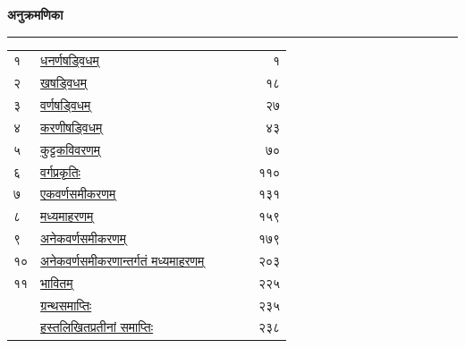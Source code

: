 \documentclass[11pt, openany]{book}
\begin{document}
\begin{center}
{\LARGE \textbf{अनुक्रमणिका}}\\
    \rule{0.2\linewidth}{0.9pt}
\end{center}

\begin{table}[h!]
    \centering
    \begin{tabular}{llr}
१ & \hyperref[ch1]{धनर्णषड्विधम्} & १ \\
२ & \hyperref[ch2]{खषड्विधम्} & १८ \\
३ & \hyperref[ch3]{वर्णषड्विधम्} & २७ \\
४ & \hyperref[ch4]{करणीषड्विधम्} & ४३ \\
५ & \hyperref[ch5]{कुट्टकविवरणम्} & ७० \\
६ & \hyperref[ch6]{वर्गप्रकृतिः} & ११० \\
७ & \hyperref[ch7]{एकवर्णसमीकरणम्} & १३१ \\
८ & \hyperref[ch8]{मध्यमाहरणम्} & १५९ \\
९ & \hyperref[ch9]{अनेकवर्णसमीकरणम्} & १७९ \\
१० & \hyperref[ch10]{अनेकवर्णसमीकरणान्तर्गतं मध्यमाहरणम्} ~~~~~~ & २०३ \\
११ & \hyperref[ch11]{भावितम्} & २२५ \\
 & \hyperref[ch12]{ग्रन्थसमाप्तिः} & २३५ \\
 & \hyperref[ch13]{हस्तलिखितप्रतीनां समाप्तिः} & २३८ \\
    \end{tabular}
\end{table}
\end{document}
